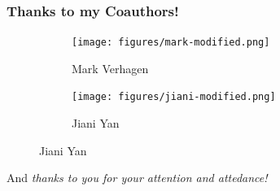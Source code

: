 \documentclass[12pt]{beamer}
\begin{document}
\begin{frame}
\frametitle{Thanks to my Coauthors!}
\begin{figure}[h]
    \centering
    \begin{subfigure}[b]{0.45\textwidth}
        \centering
        \texttt{[image: figures/mark-modified.png]} %
        \caption*{\quad \quad \quad \quad \quad Mark Verhagen}
        \label{fig:image1}
    \end{subfigure}
    \hfill \vspace{.15in}
    \begin{subfigure}[b]{0.45\textwidth}
        \centering
        \texttt{[image: figures/jiani-modified.png]} %
        \caption*{\quad \quad \quad \quad \quad \quad Jiani Yan}
        \label{fig:image2}
    \end{subfigure}
    \label{fig:two_images}
\end{figure}\pause
\begin{center}
And \emph{thanks to you for your attention and attedance!}
\end{center}
\end{frame}
\end{document}
